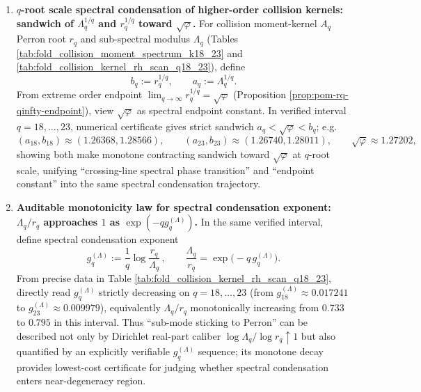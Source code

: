 \begin{enumerate}
  \item \textbf{\texorpdfstring{$q$}{q}-root scale spectral condensation of higher-order collision kernels: sandwich of \texorpdfstring{$\Lambda_q^{1/q}$}{Lambda^(1/q)} and \texorpdfstring{$r_q^{1/q}$}{r^(1/q)} toward \texorpdfstring{$\sqrt{\varphi}$}{sqrt(phi)}.}
  For collision moment-kernel \(A_q\) Perron root \(r_q\) and sub-spectral modulus \(\Lambda_q\) (Tables \ref{tab:fold_collision_moment_spectrum_k18_23} and \ref{tab:fold_collision_kernel_rh_scan_q18_23}), define
  \[
  b_q:=r_q^{1/q},\qquad a_q:=\Lambda_q^{1/q}.
  \]
  From extreme order endpoint \(\lim_{q\to\infty}r_q^{1/q}=\sqrt{\varphi}\) (Proposition \ref{prop:pom-rq-qinfty-endpoint}), view \(\sqrt{\varphi}\) as spectral endpoint constant.
  In verified interval \(q=18,\dots,23\), numerical certificate gives strict sandwich \(a_q<\sqrt{\varphi}<b_q\); e.g.
  \[
  (a_{18},b_{18})\approx(1.26368,1.28566),\qquad
  (a_{23},b_{23})\approx(1.26740,1.28011),
  \qquad
  \sqrt{\varphi}\approx 1.27202,
  \]
  showing both make monotone contracting sandwich toward \(\sqrt{\varphi}\) at \(q\)-root scale, unifying ``crossing-line spectral phase transition'' and ``endpoint constant'' into the same spectral condensation trajectory.

  \item \textbf{Auditable monotonicity law for spectral condensation exponent: \texorpdfstring{$\Lambda_q/r_q$}{Lambda/r} approaches \(1\) as \texorpdfstring{$\exp(-qg_q^{(\Lambda)})$}{exp(-qg)}.}
  In the same verified interval, define spectral condensation exponent
  \[
  g_q^{(\Lambda)}:=\frac{1}{q}\log\frac{r_q}{\Lambda_q}\,,
  \qquad
  \frac{\Lambda_q}{r_q}=\exp\!\bigl(-q\,g_q^{(\Lambda)}\bigr).
  \]
  From precise data in Table \ref{tab:fold_collision_kernel_rh_scan_q18_23}, directly read \(g_q^{(\Lambda)}\) strictly decreasing on \(q=18,\dots,23\) (from \(g_{18}^{(\Lambda)}\approx 0.017241\) to \(g_{23}^{(\Lambda)}\approx 0.009979\)), equivalently \(\Lambda_q/r_q\) monotonically increasing from \(0.733\) to \(0.795\) in this interval.
  Thus ``sub-mode sticking to Perron'' can be described not only by Dirichlet real-part caliber \(\log\Lambda_q/\log r_q\uparrow 1\) but also quantified by an explicitly verifiable \(g_q^{(\Lambda)}\) sequence; its monotone decay provides lowest-cost certificate for judging whether spectral condensation enters near-degeneracy region.


\end{enumerate}
